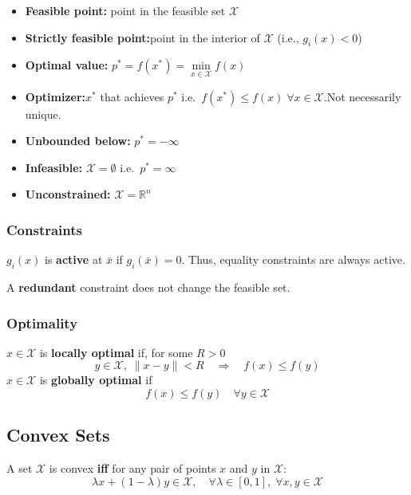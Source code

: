 \newpar{}
\begin{itemize}
    \item \textbf{Feasible point:} point in the feasible set $\mathcal{X}$
    \item \textbf{Strictly feasible point:}\newline point in the interior of $\mathcal{X}$ (i.e., $g_i(x)<0$)
    \item \textbf{Optimal value:} $p^*=f(x^*) = \min\limits_{x\in\mathcal{X}} f(x)$
    \item \textbf{Optimizer:}\newline $x^*$ that achieves $p^*$ i.e.\ $f(x^*)\leq f(x)\; \forall x\in \mathcal{X}$.\newline Not necessarily unique.
    \item \textbf{Unbounded below:} $p^*=-\infty$
    \item \textbf{Infeasible:} $\mathcal{X}=\emptyset$ i.e.\ $p^* = \infty$
    \item \textbf{Unconstrained:} $\mathcal{X}=\mathbb{R}^n$
\end{itemize}

\renewcommand{\arraystretch}{1}
\setlength\tabcolsep{\oldtabcolsep}

\subsubsection{Constraints}
$g_i(x)$ is \textbf{active} at $\bar{x}$ if $g_i(\bar{x})=0$. Thus, equality constraints are always active.

\newpar{}
A \textbf{redundant} constraint does not change the feasible set.

\subsubsection{Optimality}
$x\in \mathcal{X}$ is \textbf{locally optimal} if, for some $R>0$
\begin{equation*}
    y\in \mathcal{X},\; {\|x-y\|}<R\quad \Rightarrow\quad f(x)\leq f(y)
\end{equation*}
$x\in \mathcal{X}$ is \textbf{globally optimal} if
\begin{equation*}
    f(x)\leq f(y)\quad \forall y\in \mathcal{X}
\end{equation*}


\subsection{Convex Sets}
A set $\mathcal{X}$ is convex \textbf{iff} for any pair of points $x$ and $y$ in $\mathcal{X}$:
\begin{equation*}
    \lambda x+(1-\lambda)y\in\mathcal{X}, \quad\forall\lambda\in[0,1],\;\forall x,y\in\mathcal{X}
\end{equation*}
\newpar{}

